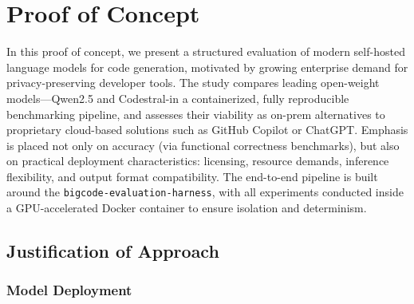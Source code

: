 \chapter{Proof of Concept}
\label{ch:proof-of-concept}

In this proof of concept, we present a structured evaluation of modern self-hosted language models for code generation, motivated by growing enterprise demand for privacy-preserving developer tools. The study compares leading open-weight models---Qwen2.5 and Codestral-in a containerized, fully reproducible benchmarking pipeline, and assesses their viability as on-prem alternatives to proprietary cloud-based solutions such as GitHub Copilot or ChatGPT. Emphasis is placed not only on accuracy (via functional correctness benchmarks), but also on practical deployment characteristics: licensing, resource demands, inference flexibility, and output format compatibility. The end-to-end pipeline is built around the \texttt{bigcode-evaluation-harness}, with all experiments conducted inside a GPU-accelerated Docker container to ensure isolation and determinism. %

\section{Justification of Approach}

\subsection{Model Deployment}



